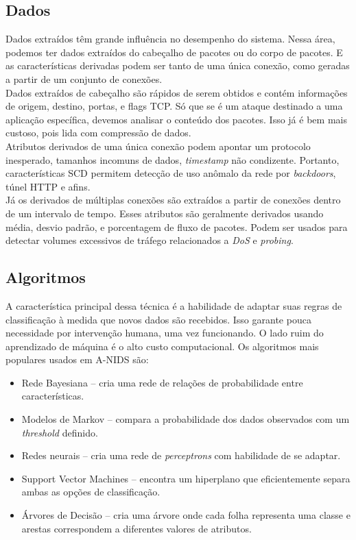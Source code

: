 \documentclass[12pt,a4paper]{article}
\begin{document}
    \subsection{Dados}
    Dados extraídos têm grande influência no desempenho do sistema. Nessa área, podemos ter dados extraídos do cabeçalho
    de pacotes ou do corpo de pacotes. E as características derivadas podem ser tanto de uma única conexão, como
    geradas a partir de um conjunto de conexões. \\
    Dados extraídos de cabeçalho são rápidos de serem obtidos e contém informações de origem, destino, portas, e flags
    TCP. Só que se é um ataque destinado a uma aplicação específica, devemos analisar o conteúdo dos pacotes.
    Isso já é bem mais custoso, pois lida com compressão de dados. \\
    Atributos derivados de uma única conexão podem apontar um protocolo inesperado, tamanhos incomuns de dados,
    \emph{timestamp} não condizente. Portanto, características SCD permitem detecção de uso anômalo da rede
    por \textit{backdoors}, túnel HTTP e afins.\\
    Já os derivados de múltiplas conexões são extraídos a partir de conexões dentro de um intervalo de tempo.
    Esses atributos são geralmente derivados usando média, desvio padrão, e porcentagem de fluxo de pacotes.
    Podem ser usados para detectar volumes excessivos de tráfego relacionados a \textit{DoS} e \textit{probing}.


    \subsection{Algoritmos}
    A característica principal dessa técnica é a habilidade de adaptar suas regras de classificação à medida que
    novos dados são recebidos. Isso garante pouca necessidade por intervenção humana, uma vez funcionando. O lado ruim
    do aprendizado de máquina é o alto custo computacional. Os algoritmos mais populares usados em A-NIDS são:
    \begin{itemize}
        \item Rede Bayesiana -- cria uma rede de relações de probabilidade entre características.
        \item Modelos de Markov -- compara a probabilidade dos dados observados com um \emph{threshold} definido.
        \item Redes neurais -- cria uma rede de \emph{perceptrons} com habilidade de se adaptar.
        \item Support Vector Machines -- encontra um hiperplano que eficientemente separa ambas as opções de classificação.
        \item Árvores de Decisão -- cria uma árvore onde cada folha representa uma classe e arestas correspondem a
            diferentes valores de atributos.
    \end{itemize}
\end{document}
